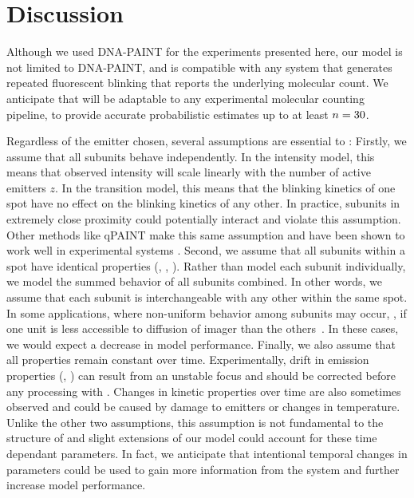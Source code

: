 \section{Discussion} \label{discussion}

Although we used DNA-PAINT for the experiments presented here, our model is not
limited to DNA-PAINT, and is compatible with any system that generates repeated
fluorescent blinking that reports the underlying molecular count.
  We anticipate that \ours will be adaptable to any experimental molecular
  counting pipeline, to provide accurate 
  probabilistic estimates up to at least $n=30$.

Regardless of the emitter chosen, several assumptions are
essential to \ours:
  Firstly, we assume that all subunits behave independently.
  In the intensity model, this means that observed intensity will scale
  linearly with the number of active emitters $z$.
  In the transition model, this means that the blinking kinetics of one spot
  have no effect on the blinking kinetics of any other.
  In practice, subunits in extremely close proximity could
  potentially interact and violate this assumption.
  Other methods like qPAINT make this same assumption and have been shown to
  work well in experimental systems \citep{fischer_quantitative_2021,
  jayasinghe_true_2018}. 
  Second, we assume that all subunits within a spot have identical properties
  (\pon, \poff, \re).
  Rather than model each subunit individually, we model the summed behavior
  of all subunits combined. 
  In other words, we assume that each subunit is
  interchangeable with any other within the same spot.
  In some applications, where non-uniform behavior among subunits may occur, \eg,
  if one unit is less accessible to diffusion of
  imager than the others~\citep{civitci_2020}. 
  In these cases, we would expect a decrease in model performance.
  Finally, we also assume that all properties remain constant over time. 
  Experimentally, drift in emission properties (\re, \rb) can result from 
  an unstable focus and should be corrected before any processing with
  \ours.
  Changes in kinetic properties over time are also sometimes observed and could
  be caused by damage to emitters or changes in temperature. 
  Unlike the other two assumptions, this assumption is not fundamental to the
  structure of \ours and slight extensions of our model could account for these
  time dependant parameters.
  In fact, we anticipate that intentional temporal changes in parameters could be used to gain more
  information from the system and further increase model performance.

